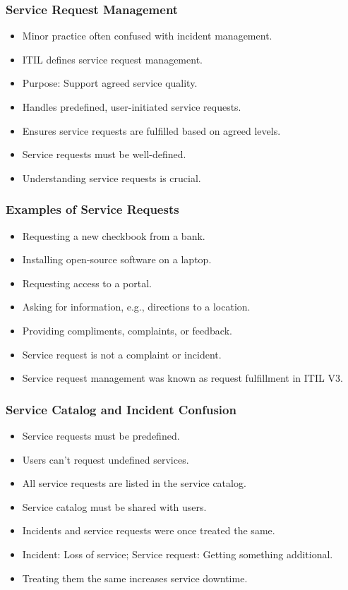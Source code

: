 \documentclass[aspectratio=169, table]{beamer}
\begin{document}
\begin{frame}
	\frametitle{Service Request Management}
	\begin{itemize}
		\item Minor practice often confused with incident management.
		\item ITIL defines service request management.
		\item Purpose: Support agreed service quality.
		\item Handles predefined, user-initiated service requests.
		\item Ensures service requests are fulfilled based on agreed levels.
		\item Service requests must be well-defined.
		\item Understanding service requests is crucial.
	\end{itemize}
\end{frame}

\begin{frame}
	\frametitle{Examples of Service Requests}
	\begin{itemize}
		\item Requesting a new checkbook from a bank.
		\item Installing open-source software on a laptop.
		\item Requesting access to a portal.
		\item Asking for information, e.g., directions to a location.
		\item Providing compliments, complaints, or feedback.
		\item Service request is not a complaint or incident.
		\item Service request management was known as request fulfillment in ITIL V3.
	\end{itemize}
\end{frame}

\begin{frame}
	\frametitle{Service Catalog and Incident Confusion}
	\begin{itemize}
		\item Service requests must be predefined.
		\item Users can't request undefined services.
		\item All service requests are listed in the service catalog.
		\item Service catalog must be shared with users.
		\item Incidents and service requests were once treated the same.
		\item Incident: Loss of service; Service request: Getting something additional.
		\item Treating them the same increases service downtime.
	\end{itemize}
\end{frame}
\end{document}
